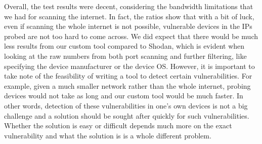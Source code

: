 Overall, the test results were decent, considering the bandwidth
limitations that we had for scanning the internet. In fact, the ratios
show that with a bit of luck, even if scanning the whole internet is not
possible, vulnerable devices in the IPs probed are not too hard to come
across. We did expect that there would be much less results from our
custom tool compared to Shodan, which is evident when looking at the
raw numbers from both port scanning and further filtering, like specifying
the device manufacturer or the device OS.
However, it is important to take note of the feasibility of writing a tool
to detect certain vulnerabilities. For example, given a much smaller
network rather than the whole internet, probing devices would not take
as long and our custom tool would be much faster. In other words, detection
of these vulnerabilities in one's own devices is not a big challenge
and a solution should be sought after quickly for such vulnerabilities.
Whether the solution is easy or difficult depends much more on the exact
vulnerability and what the solution is is a whole different problem.
